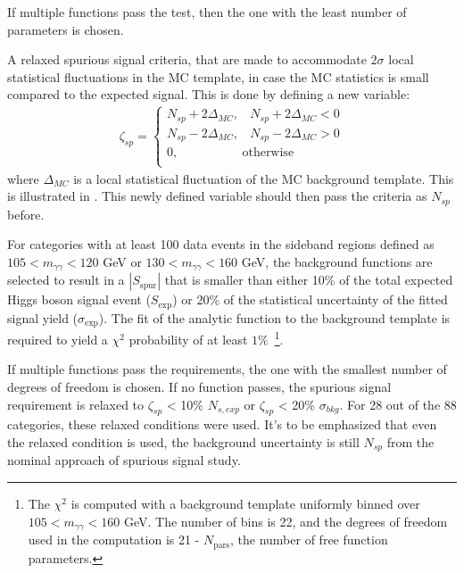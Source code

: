 If multiple functions pass the test, then the one with the least number of parameters is chosen.

    A relaxed spurious signal criteria, that are made to accommodate $2\sigma$ local statistical fluctuations in the MC template, in case the MC statistics is small compared to the expected signal. This is done by defining a new variable:
\begin{align}
    \zeta_{sp} = 
   \begin{cases}
N_{sp} + 2\Delta_{MC},~~~~ N_{sp} + 2\Delta_{MC}<0\\
N_{sp} - 2\Delta_{MC},~~~~ N_{sp} - 2\Delta_{MC}>0\\
0, ~~~~~~~~~~~~~~~~~~~~~~~\text{otherwise}\\
\end{cases}
 \label{eq:relSpuriousSignalMetric}
\end{align}
where $\Delta_{MC}$ is a local statistical fluctuation of the MC background template. This is illustrated in \Fig{\ref{fig:relaxed_ss_cartoon}}. This newly defined variable should then pass the criteria as $N_{sp}$ before. 

For categories with at least 100 data events in the sideband regions defined as $105 < m_{\gamma\gamma} < 120$ GeV or $130 < m_{\gamma\gamma} < 160$ GeV, the background functions are selected to result in a $|S_{\text{spur}}|$ that is smaller than either 10\% of the total expected Higgs boson signal event ($S_{\text{exp}}$) or 20\% of the statistical uncertainty of the fitted signal yield ($\sigma_{\text{exp}}$). The fit of the analytic function to the background template is required to yield a $\chi^2$ probability of at least $1\%$~\footnote{The $\chi^2$ is computed with a background template uniformly binned over $105<m_{\gamma\gamma}<160$ GeV. The number of bins is 22, and the degrees of freedom used in the computation is 21 - $N_{\text{pars}}$, the number of free function parameters.}.

If multiple functions pass the requirements, the one with the smallest number of degrees of freedom is chosen. If no function passes, the spurious signal requirement is relaxed to  
 $\zeta_{sp}$ < 10\% $N_{s,exp}$ or $\zeta_{sp}$ < 20\% $\sigma_{bkg}$.
For 28 out of the 88 categories, these relaxed conditions were used. 
It's to be emphasized that even the relaxed condition is used, the background uncertainty is still $N_{sp}$ from the nominal approach of spurious signal study.





